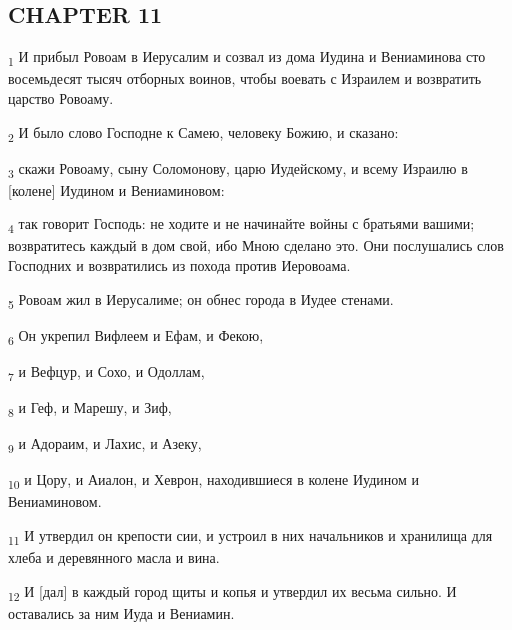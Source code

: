 \subsection{CHAPTER 11}
\begin{tcolorbox}
\textsubscript{1} И прибыл Ровоам в Иерусалим и созвал из дома Иудина и Вениаминова сто восемьдесят тысяч отборных воинов, чтобы воевать с Израилем и возвратить царство Ровоаму.
\end{tcolorbox}
\begin{tcolorbox}
\textsubscript{2} И было слово Господне к Самею, человеку Божию, и сказано:
\end{tcolorbox}
\begin{tcolorbox}
\textsubscript{3} скажи Ровоаму, сыну Соломонову, царю Иудейскому, и всему Израилю в [колене] Иудином и Вениаминовом:
\end{tcolorbox}
\begin{tcolorbox}
\textsubscript{4} так говорит Господь: не ходите и не начинайте войны с братьями вашими; возвратитесь каждый в дом свой, ибо Мною сделано это. Они послушались слов Господних и возвратились из похода против Иеровоама.
\end{tcolorbox}
\begin{tcolorbox}
\textsubscript{5} Ровоам жил в Иерусалиме; он обнес города в Иудее стенами.
\end{tcolorbox}
\begin{tcolorbox}
\textsubscript{6} Он укрепил Вифлеем и Ефам, и Фекою,
\end{tcolorbox}
\begin{tcolorbox}
\textsubscript{7} и Вефцур, и Сохо, и Одоллам,
\end{tcolorbox}
\begin{tcolorbox}
\textsubscript{8} и Геф, и Марешу, и Зиф,
\end{tcolorbox}
\begin{tcolorbox}
\textsubscript{9} и Адораим, и Лахис, и Азеку,
\end{tcolorbox}
\begin{tcolorbox}
\textsubscript{10} и Цору, и Аиалон, и Хеврон, находившиеся в колене Иудином и Вениаминовом.
\end{tcolorbox}
\begin{tcolorbox}
\textsubscript{11} И утвердил он крепости сии, и устроил в них начальников и хранилища для хлеба и деревянного масла и вина.
\end{tcolorbox}
\begin{tcolorbox}
\textsubscript{12} И [дал] в каждый город щиты и копья и утвердил их весьма сильно. И оставались за ним Иуда и Вениамин.
\end{tcolorbox}
